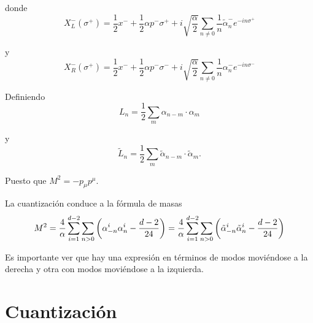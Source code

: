 donde 
\begin{equation}
  X^-_L(\sigma^+)=\frac 1 2 x^- + \frac 1 2 \alpha p^- \sigma^+ + i\sqrt{\frac \alpha 2}
  \sum_{n\neq0} \frac 1 n \tilde{\alpha}^-_n e^{-in\sigma^+}
\end{equation}

y
\begin{equation}
  X^-_R(\sigma^+)=\frac 1 2 x^- + \frac 1 2 \alpha p^- \sigma^- + i\sqrt{\frac \alpha 2}
  \sum_{n\neq0} \frac 1 n \alpha^-_n e^{-in\sigma^-}
\end{equation}

Definiendo
\begin{equation}
  L_n=\frac 1 2 \sum_m \alpha_{n-m} \cdot \alpha_m
\end{equation}

y
\begin{equation}
  \tilde{L}_n=\frac 1 2 \sum_m \tilde{\alpha}_{n-m} \cdot \tilde{\alpha}_m.
\end{equation}

Puesto que $M^2=-p_\mu p^\mu$.

La cuantización conduce a la fórmula de masas 
\begin{equation}
  M^2=\frac{4}{\alpha}\sum_{i=1}^{d-2}\sum_{n>0}\qty(\alpha^i_{-n}\alpha^i_n - \frac{d-2}{24})=
  \frac{4}{\alpha}\sum_{i=1}^{d-2}\sum_{n>0}\qty(\tilde{\alpha}^i_{-n}\tilde{\alpha}^i_n -\frac{d-2}{24})
\end{equation}

Es importante ver que hay una expresión en términos de modos moviéndose a la derecha
y otra con modos moviéndose a la izquierda.

\section{Cuantización}


